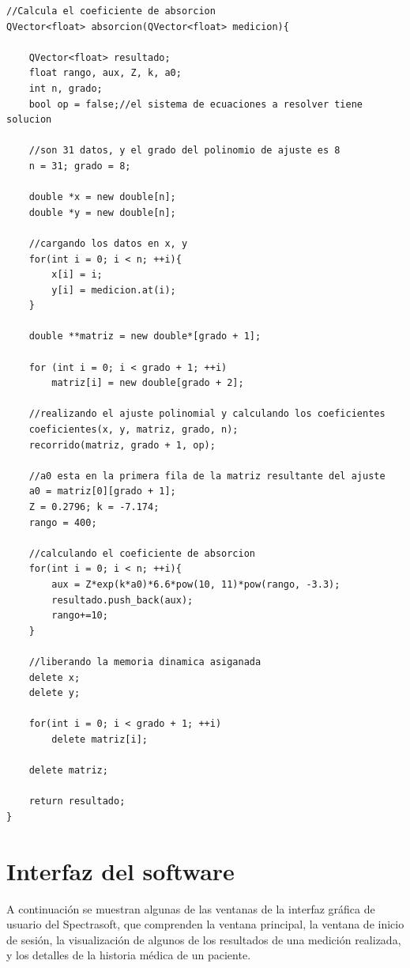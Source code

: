 \begin{itemize}
			\begin{lstlisting}
//Calcula el coeficiente de absorcion
QVector<float> absorcion(QVector<float> medicion){

    QVector<float> resultado;
    float rango, aux, Z, k, a0;
    int n, grado;
    bool op = false;//el sistema de ecuaciones a resolver tiene solucion
    
    //son 31 datos, y el grado del polinomio de ajuste es 8
    n = 31; grado = 8;

    double *x = new double[n];
    double *y = new double[n];

    //cargando los datos en x, y
    for(int i = 0; i < n; ++i){
        x[i] = i;
        y[i] = medicion.at(i);
    }

    double **matriz = new double*[grado + 1];

    for (int i = 0; i < grado + 1; ++i)
        matriz[i] = new double[grado + 2];

    //realizando el ajuste polinomial y calculando los coeficientes
    coeficientes(x, y, matriz, grado, n);
    recorrido(matriz, grado + 1, op);

    //a0 esta en la primera fila de la matriz resultante del ajuste
    a0 = matriz[0][grado + 1];
    Z = 0.2796; k = -7.174;
    rango = 400;

    //calculando el coeficiente de absorcion
    for(int i = 0; i < n; ++i){
        aux = Z*exp(k*a0)*6.6*pow(10, 11)*pow(rango, -3.3);
        resultado.push_back(aux);
        rango+=10;
    }

    //liberando la memoria dinamica asiganada
    delete x;
    delete y;

    for(int i = 0; i < grado + 1; ++i)
        delete matriz[i];

    delete matriz;

    return resultado;
}
			\end{lstlisting}

	\end{itemize}

\newpage

\section{Interfaz del software}

	A continuaci\'{o}n se muestran algunas de las ventanas de la interfaz gr\'{a}fica de usuario del Spectrasoft, que comprenden la ventana principal, la ventana de inicio de sesi\'{o}n, la visualizaci\'{o}n de algunos de los resultados de una medici\'{o}n realizada, y los detalles de la historia m\'{e}dica de un paciente.

